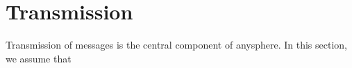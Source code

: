 \section{Transmission}
Transmission of messages is the central component of anysphere. In this section, we assume that 